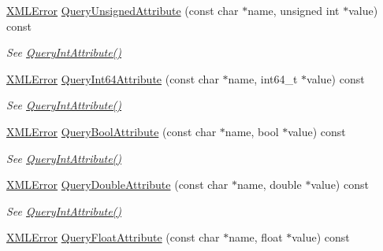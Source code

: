 \begin{DoxyCompactItemize}
\mbox{\hyperlink{namespacetinyxml2_a1fbf88509c3ac88c09117b1947414e08}{X\+M\+L\+Error}} \mbox{\hyperlink{classtinyxml2_1_1_x_m_l_element_a26fc84cbfba6769dafcfbf256c05e22f}{Query\+Unsigned\+Attribute}} (const char $\ast$name, unsigned int $\ast$value) const
\begin{DoxyCompactList}\small\item\em See \mbox{\hyperlink{classtinyxml2_1_1_x_m_l_element_a8a78bc1187c1c45ad89f2690eab567b1}{Query\+Int\+Attribute()}} \end{DoxyCompactList}\item 
\mbox{\hyperlink{namespacetinyxml2_a1fbf88509c3ac88c09117b1947414e08}{X\+M\+L\+Error}} \mbox{\hyperlink{classtinyxml2_1_1_x_m_l_element_a7c0955d80b6f8d196744eacb0f6e90a8}{Query\+Int64\+Attribute}} (const char $\ast$name, int64\+\_\+t $\ast$value) const
\begin{DoxyCompactList}\small\item\em See \mbox{\hyperlink{classtinyxml2_1_1_x_m_l_element_a8a78bc1187c1c45ad89f2690eab567b1}{Query\+Int\+Attribute()}} \end{DoxyCompactList}\item 
\mbox{\hyperlink{namespacetinyxml2_a1fbf88509c3ac88c09117b1947414e08}{X\+M\+L\+Error}} \mbox{\hyperlink{classtinyxml2_1_1_x_m_l_element_a14c1bb77c39689838be01838d86ca872}{Query\+Bool\+Attribute}} (const char $\ast$name, bool $\ast$value) const
\begin{DoxyCompactList}\small\item\em See \mbox{\hyperlink{classtinyxml2_1_1_x_m_l_element_a8a78bc1187c1c45ad89f2690eab567b1}{Query\+Int\+Attribute()}} \end{DoxyCompactList}\item 
\mbox{\hyperlink{namespacetinyxml2_a1fbf88509c3ac88c09117b1947414e08}{X\+M\+L\+Error}} \mbox{\hyperlink{classtinyxml2_1_1_x_m_l_element_a5f0964e2dbd8e2ee7fce9beab689443c}{Query\+Double\+Attribute}} (const char $\ast$name, double $\ast$value) const
\begin{DoxyCompactList}\small\item\em See \mbox{\hyperlink{classtinyxml2_1_1_x_m_l_element_a8a78bc1187c1c45ad89f2690eab567b1}{Query\+Int\+Attribute()}} \end{DoxyCompactList}\item 
\mbox{\hyperlink{namespacetinyxml2_a1fbf88509c3ac88c09117b1947414e08}{X\+M\+L\+Error}} \mbox{\hyperlink{classtinyxml2_1_1_x_m_l_element_acd5eeddf6002ef90806af794b9d9a5a5}{Query\+Float\+Attribute}} (const char $\ast$name, float $\ast$value) const

\end{DoxyCompactItemize}

